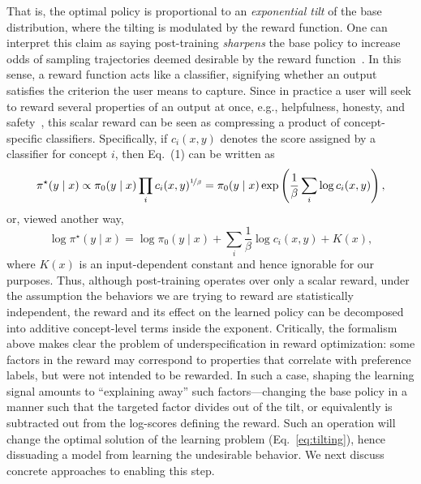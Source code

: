 \documentclass{article} %
\newcommand{\pie}{{\pi}}
\begin{document}
That is, the optimal policy is proportional to an \textit{exponential tilt} of the base distribution, where the tilting is modulated by the reward function.
% 
One can interpret this claim as saying post-training \textit{sharpens} the base policy to increase odds of sampling trajectories deemed desirable by the reward function~\citep{karan2025reasoning}.
% 
In this sense, a reward function acts like a classifier, signifying whether an output satisfies the criterion the user means to capture.
% 
% 
Since in practice a user will seek to reward several properties of an output at once, e.g., helpfulness, honesty, and safety~\citep{bai2022constitutional}, this scalar reward can be seen as compressing a product of concept-specific classifiers. 
% 
Specifically, if $c_i(x,y)$ denotes the score assigned by a classifier for concept $i$, then Eq.~(1) can be written as
% 
\begin{equation}
    \pie^\star(y \mid x) \propto 
    \pie_0(y \mid x) \prod_i c_i(x,y)^{\nicefrac{1}{\beta}} = 
    \pie_0(y \mid x) \exp\left( \frac{1}{\beta} \sum_i \log c_i(x,y) \right), 
\end{equation}
or, viewed another way,
\begin{equation}
\label{eq:additive-tilt}
    \log \pie^\star(y \mid x) = \log 
    \pie_0(y \mid x) + \sum_i \frac{1}{\beta} \log c_i(x,y) + K(x), 
\end{equation}
where $K(x)$ is an input-dependent constant and hence ignorable for our purposes.
% 
Thus, although post-training operates over only a scalar reward, under the assumption the behaviors we are trying to reward are statistically independent, the reward and its effect on the learned policy can be decomposed into additive concept-level terms inside the exponent. 
% 
Critically, the formalism above makes clear the problem of underspecification in reward optimization: some factors in the reward may correspond to properties that correlate with preference labels, but were not intended to be rewarded.
% 
In such a case, shaping the learning signal amounts to ``explaining away'' such factors---changing the base policy in a manner such that the targeted factor divides out of the tilt, or equivalently is subtracted out from the log-scores defining the reward. 
% 
Such an operation will change the optimal solution of the learning problem (Eq.~\ref{eq:tilting}), hence dissuading a model from learning the undesirable behavior.
% 
We next discuss concrete approaches to enabling this step.
\end{document}
